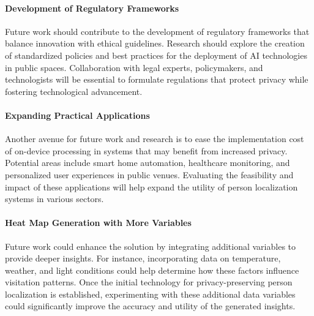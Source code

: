 
\paragraph{Development of Regulatory Frameworks}
Future work should contribute to the development of regulatory frameworks that balance innovation with ethical guidelines. Research should explore the creation of standardized policies and best practices for the deployment of AI technologies in public spaces. Collaboration with legal experts, policymakers, and technologists will be essential to formulate regulations that protect privacy while fostering technological advancement.

\paragraph{Expanding Practical Applications} Another avenue for future work and research is to ease the implementation cost of on-device processing in systems that may benefit from increased privacy. Potential areas include smart home automation, healthcare monitoring, and personalized user experiences in public venues. Evaluating the feasibility and impact of these applications will help expand the utility of person localization systems in various sectors.

\paragraph{Heat Map Generation with More Variables}
Future work could enhance the solution by integrating additional variables to provide deeper insights. For instance, incorporating data on temperature, weather, and light conditions could help determine how these factors influence visitation patterns. Once the initial technology for privacy-preserving person localization is established, experimenting with these additional data variables could significantly improve the accuracy and utility of the generated insights.

